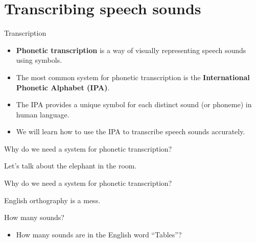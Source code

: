 \documentclass[professionalfonts]{beamer}
\begin{document}
\section{Transcribing speech sounds}

\begin{frame}{Transcription}
    \begin{itemize}
        \item \textbf{Phonetic transcription} is a way of visually representing speech sounds using symbols.
        \item The most common system for phonetic transcription is the \textbf{International Phonetic Alphabet (IPA)}.
        \item The IPA provides a unique symbol for each distinct sound (or phoneme) in human language.
        \item We will learn how to use the IPA to transcribe speech sounds accurately.
    \end{itemize}
\end{frame}

\begin{frame}{Why do we need a system for phonetic transcription?}
    \begin{center}
        \huge Let's talk about the elephant in the room.
    \end{center}
\end{frame}

\begin{frame}{Why do we need a system for phonetic transcription?}
    \begin{center}
        \huge English orthography is a mess. 
    \end{center}
\end{frame}

\begin{frame}{How many sounds?}
    \begin{itemize}
        \item How many sounds are in the English word ``Tables''?
    \end{itemize}
\end{frame}
\end{document}
